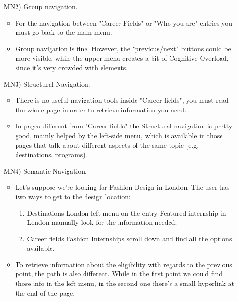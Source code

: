 \documentclass[11pt, letterpaper]{article}
\begin{document}
\begin{enumerate}
\begin{itemize}
            \end{itemize}
        \item[MN2)] Group navigation.
            \begin{itemize}
                \item For the navigation between "Career Fields" or "Who you are" entries
                you must go back to the main menu.
                \item Group navigation is fine. However, the "previous/next" buttons could be more visible, while the upper menu creates a bit of Cognitive Overload, since it's very crowded with elements. 
            \end{itemize}
        \item[MN3)] Structural Navigation.
            \begin{itemize}
                \item There is no useful navigation tools inside "Career fields", you must read the whole page in order to retrieve information you need.
                \item In pages different from "Career fields" the Structural navigation is pretty good, mainly helped by the left-side menu, which is available in those pages that talk about different aspects of the same topic (e.g. destinations, programs).
            \end{itemize}
        \item[MN4)] Semantic Navigation.
            \begin{itemize}
                \item Let's suppose we're looking for Fashion Design in London. The user has two ways to get to the design location:
                \begin{enumerate}
                    \item Destinations \textrightarrow{} London \textrightarrow{} left menu on the entry Featured internship in London \textrightarrow{} manually look for the information needed.
                    \item Career fields \textrightarrow{} Fashion Internships \textrightarrow{} scroll down and find all the options available.
                \end{enumerate}
            \item To retrieve information about the eligibility with regards to the previous point, the path is also different. While in the first point we could find those info in the left menu, in the second one there's a small hyperlink at the end of the page.

\end{itemize}
\end{enumerate}
\end{document}
